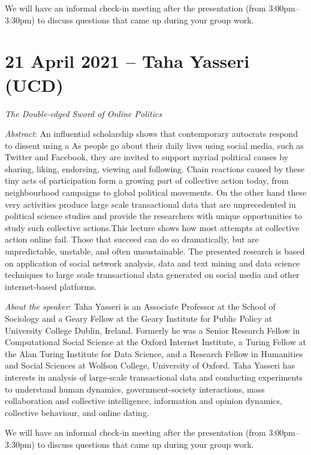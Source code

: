 \documentclass[abstract=on,parskip=full,headings=standardclasses,fontsize=11pt,paper=a4]{scrartcl}
\begin{document}
  
  

We will have an informal check-in meeting after the presentation (from 3:00pm--3:30pm) to discuss questions that came up during your group work.


\section{21 April 2021 -- Taha Yasseri (UCD)}


 \textit{The Double-edged Sword of Online Politics}


\textit{Abstract}: An influential scholarship shows that contemporary autocrats respond to dissent using a As people go about their daily lives using social media, such as Twitter and Facebook, they are invited to support myriad political causes by sharing, liking, endorsing, viewing and following. Chain reactions caused by these tiny acts of participation form a growing part of collective action today, from neighbourhood campaigns to global political movements. On the other hand these very activities produce large scale transactional data that are unprecedented in political science studies and provide the researchers with unique opportunities to study such collective actions.This lecture shows how most attempts at collective action online fail. Those that succeed can do so dramatically, but are unpredictable, unstable, and often unsustainable. The presented research is based on application of social network analysis, data and text mining and data science techniques to large scale transactional data generated on social media and other internet-based platforms.


\textit{About the speaker}: Taha Yasseri is an Associate Professor at the School of Sociology and a Geary Fellow at the Geary Institute for Public Policy at University College Dublin, Ireland. Formerly he was a Senior Research Fellow in Computational Social Science at the Oxford Internet Institute, a Turing Fellow at the Alan Turing Institute for Data Science, and a Research Fellow in Humanities and Social Sciences at Wolfson College, University of Oxford. Taha Yasseri has interests in analysis of large-scale transactional data and conducting experiments to understand human dynamics, government-society interactions, mass collaboration and collective intelligence, information and opinion dynamics, collective behaviour, and online dating.


We will have an informal check-in meeting after the presentation (from 3:00pm--3:30pm) to discuss questions that came up during your group work.
\end{document}
